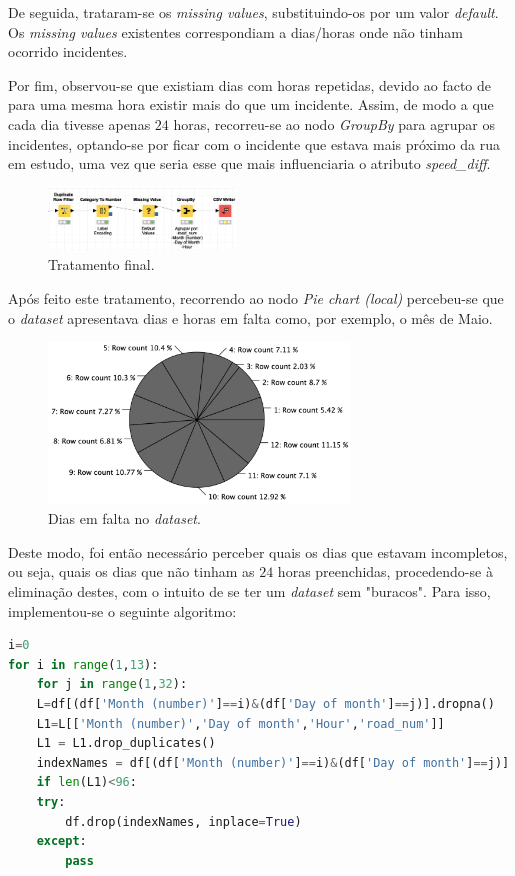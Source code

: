 \documentclass[a4paper, 12pt]{article}
\begin{document}
De seguida, trataram-se os \textit{missing values}, substituindo-os por um valor \textit{default}. Os \textit{missing values} existentes correspondiam a dias/horas onde não tinham ocorrido incidentes.

Por fim, observou-se que existiam dias com horas repetidas, devido ao facto de para uma mesma hora existir mais do que um incidente. Assim, de modo a que cada dia tivesse apenas $24$ horas, recorreu-se ao nodo \textit{GroupBy} para agrupar os incidentes, optando-se por ficar com o incidente que estava mais próximo da rua em estudo, uma vez que seria esse que mais influenciaria o atributo \textit{speed\_diff}.

\begin{figure}[H]
	\centering
	\includegraphics[width=5cm]{fim}
	\caption{Tratamento final.}
\end{figure}

Após feito este tratamento, recorrendo ao nodo \textit{Pie chart (local)} percebeu-se que o \textit{dataset} apresentava dias e horas em falta como, por exemplo, o mês de Maio.

\begin{figure}[H]
	\centering
	\includegraphics[width=8cm]{mes_dias}
	\caption{Dias em falta no \textit{dataset}.}
\end{figure}

Deste modo, foi então necessário perceber quais os dias que estavam incompletos, ou seja, quais os dias que não tinham as $24$ horas preenchidas, procedendo-se à eliminação destes, com o intuito de se ter um \textit{dataset} sem "buracos". Para isso, implementou-se o seguinte algoritmo:

\begin{lstlisting}[language=Python]
i=0
for i in range(1,13):
	for j in range(1,32):
	L=df[(df['Month (number)']==i)&(df['Day of month']==j)].dropna()
	L1=L[['Month (number)','Day of month','Hour','road_num']]
	L1 = L1.drop_duplicates()
	indexNames = df[(df['Month (number)']==i)&(df['Day of month']==j)].index
	if len(L1)<96:
	try:
		df.drop(indexNames, inplace=True)
	except:
		pass
\end{lstlisting}
\end{document}

